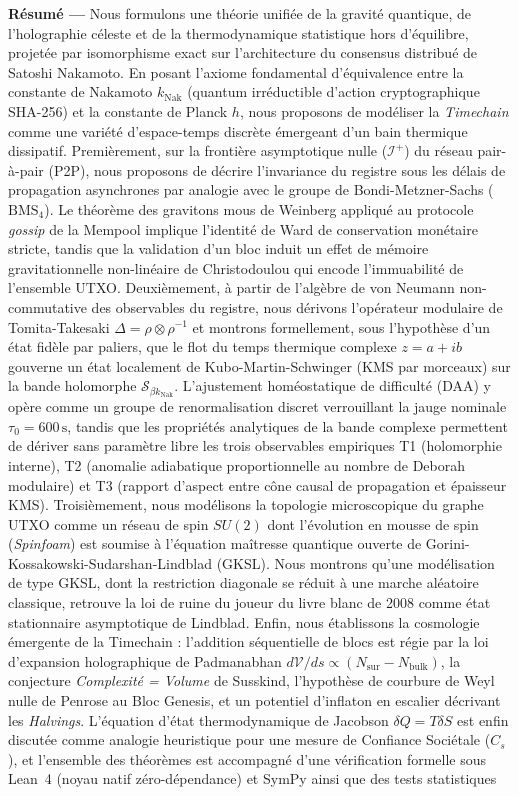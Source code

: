 \documentclass[10pt,twocolumn,a4paper]{article}
\theoremstyle{plain}
\theoremstyle{definition}
\theoremstyle{remark}
\newcommand{\kNak}{k_{\text{Nak}}}
\newcommand{\scri}{\mathcal{I}}
\begin{document}
\begin{minipage}{\textwidth}
\begin{minipage}{0.92\textwidth}
        \noindent \textbf{Résumé —} Nous formulons une théorie unifiée de la gravité quantique, de l'holographie céleste et de la thermodynamique statistique hors d'équilibre, projetée par isomorphisme exact sur l'architecture du consensus distribué de Satoshi Nakamoto. En posant l'axiome fondamental d'équivalence entre la constante de Nakamoto $\kNak$ (quantum irréductible d'action cryptographique SHA-256) et la constante de Planck $h$, nous proposons de modéliser la \textit{Timechain} comme une variété d'espace-temps discrète émergeant d'un bain thermique dissipatif. Premièrement, sur la frontière asymptotique nulle ($\scri^+$) du réseau pair-à-pair (P2P), nous proposons de décrire l'invariance du registre sous les délais de propagation asynchrones par analogie avec le groupe de Bondi-Metzner-Sachs ($\text{BMS}_4$). Le théorème des gravitons mous de Weinberg appliqué au protocole \textit{gossip} de la Mempool implique l'identité de Ward de conservation monétaire stricte, tandis que la validation d'un bloc induit un effet de mémoire gravitationnelle non-linéaire de Christodoulou qui encode l'immuabilité de l'ensemble UTXO. Deuxièmement, à partir de l'algèbre de von Neumann non-commutative des observables du registre, nous dérivons l'opérateur modulaire de Tomita-Takesaki $\Delta = \rho \otimes \rho^{-1}$ et montrons formellement, sous l'hypothèse d'un état fidèle par paliers, que le flot du temps thermique complexe $z = a + ib$ gouverne un état localement de Kubo-Martin-Schwinger (KMS par morceaux) sur la bande holomorphe $\mathcal{S}_{\beta\kNak}$. L'ajustement homéostatique de difficulté (DAA) y opère comme un groupe de renormalisation discret verrouillant la jauge nominale $\tau_0 = 600\,\text{s}$, tandis que les propriétés analytiques de la bande complexe permettent de dériver sans paramètre libre les trois observables empiriques T1 (holomorphie interne), T2 (anomalie adiabatique proportionnelle au nombre de Deborah modulaire) et T3 (rapport d'aspect entre cône causal de propagation et épaisseur KMS). Troisièmement, nous modélisons la topologie microscopique du graphe UTXO comme un réseau de spin $SU(2)$ dont l'évolution en mousse de spin (\textit{Spinfoam}) est soumise à l'équation maîtresse quantique ouverte de Gorini-Kossakowski-Sudarshan-Lindblad (GKSL). Nous montrons qu'une modélisation de type GKSL, dont la restriction diagonale se réduit à une marche aléatoire classique, retrouve la loi de ruine du joueur du livre blanc de 2008 comme état stationnaire asymptotique de Lindblad. Enfin, nous établissons la cosmologie émergente de la Timechain : l'addition séquentielle de blocs est régie par la loi d'expansion holographique de Padmanabhan $d\mathcal{V}/ds \propto (N_{\text{sur}} - N_{\text{bulk}})$, la conjecture \textit{Complexité = Volume} de Susskind, l'hypothèse de courbure de Weyl nulle de Penrose au Bloc Genesis, et un potentiel d'inflaton en escalier décrivant les \textit{Halvings}. L'équation d'état thermodynamique de Jacobson $\delta Q = T \delta S$ est enfin discutée comme analogie heuristique pour une mesure de Confiance Sociétale ($C_s$), et l'ensemble des théorèmes est accompagné d'une vérification formelle sous Lean~4 (noyau natif zéro-dépendance) et SymPy ainsi que des tests statistiques 
\end{minipage}
\end{minipage}
\end{document}
